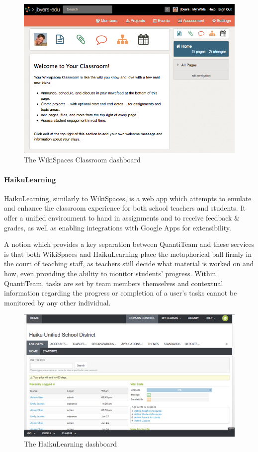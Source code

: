 \begin{figure}[htbp]
\centering
\includegraphics{../screenshots/wikispaces.png}
\caption{The WikiSpaces Classroom dashboard}
\end{figure}

\paragraph{HaikuLearning}\label{haikulearning}

HaikuLearning\cite{haikulearning}, similarly to WikiSpaces, is a web app which attempts to
emulate and enhance the classroom experience for both school teachers
and students. It offer a unified environment to hand in assignments and
to receive feedback \& grades, as well as enabling integrations with
Google Apps for extensibility.

A notion which provides a key separation between QuantiTeam and these
services is that both WikiSpaces and HaikuLearning place the
metaphorical ball firmly in the court of teaching staff, as teachers
still decide what material is worked on and how, even providing the
ability to monitor students' progress. Within QuantiTeam, tasks are set
by team members themselves and contextual information regarding the
progress or completion of a user's tasks cannot be monitored by any
other individual.

\begin{figure}[htbp]
\centering
\includegraphics{../screenshots/haikulearning.jpg}
\caption{The HaikuLearning dashboard}
\end{figure}

